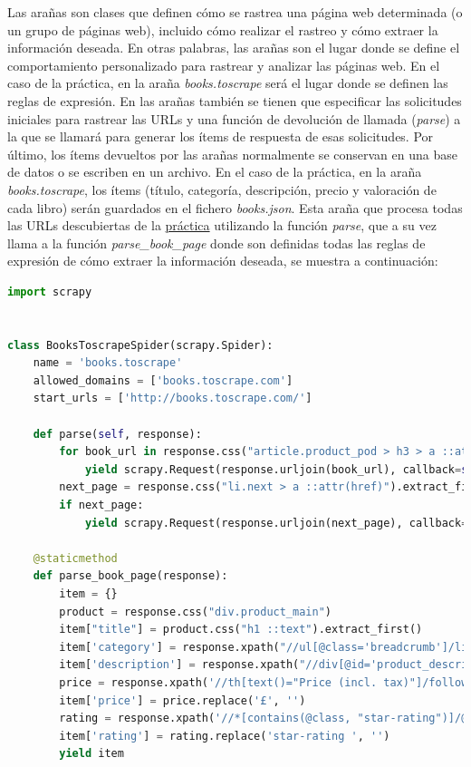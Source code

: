 \documentclass{uimppracticas}
\begin{document}
Las arañas son clases que definen cómo se rastrea una página web determinada (o un grupo de páginas web), incluido cómo realizar el rastreo y cómo extraer la información deseada. En otras palabras, las arañas son el lugar donde se define el comportamiento personalizado para rastrear y analizar las páginas web. En el caso de la práctica, en la araña \textit{books.toscrape} será el lugar donde se definen las reglas de expresión. En las arañas también se tienen que especificar las solicitudes iniciales para rastrear las URLs y una función de devolución de llamada (\textit{parse}) a la que se llamará para generar los ítems de respuesta de esas solicitudes. Por último, los ítems devueltos por las arañas normalmente se conservan en una base de datos o se escriben en un archivo. En el caso de la práctica, en la araña \textit{books.toscrape}, los ítems (título, categoría, descripción, precio y valoración de cada libro) serán guardados en el fichero \textit{books.json}. Esta araña que procesa todas las URLs descubiertas de la \href{http://books.toscrape.com}{práctica} utilizando la función \textit{parse}, que a su vez llama a la función \textit{parse\_book\_page} donde son definidas todas las reglas de expresión de cómo extraer la información deseada, se muestra a continuación:

\begin{lstlisting}[language=python]
import scrapy


class BooksToscrapeSpider(scrapy.Spider):
	name = 'books.toscrape'
	allowed_domains = ['books.toscrape.com']
	start_urls = ['http://books.toscrape.com/']
	
	def parse(self, response):
		for book_url in response.css("article.product_pod > h3 > a ::attr(href)").extract():
			yield scrapy.Request(response.urljoin(book_url), callback=self.parse_book_page)
		next_page = response.css("li.next > a ::attr(href)").extract_first()
		if next_page:
			yield scrapy.Request(response.urljoin(next_page), callback=self.parse)
	
	@staticmethod
	def parse_book_page(response):
		item = {}
		product = response.css("div.product_main")
		item["title"] = product.css("h1 ::text").extract_first()
		item['category'] = response.xpath("//ul[@class='breadcrumb']/li[@class='active']/preceding-sibling::li[1]/a/text()").extract_first()
		item['description'] = response.xpath("//div[@id='product_description']/following-sibling::p/text()").extract_first()
		price = response.xpath('//th[text()="Price (incl. tax)"]/following-sibling::td/text()').extract_first()
		item['price'] = price.replace('£', '')
		rating = response.xpath('//*[contains(@class, "star-rating")]/@class').extract_first()
		item['rating'] = rating.replace('star-rating ', '')
		yield item
\end{lstlisting}
\end{document}
